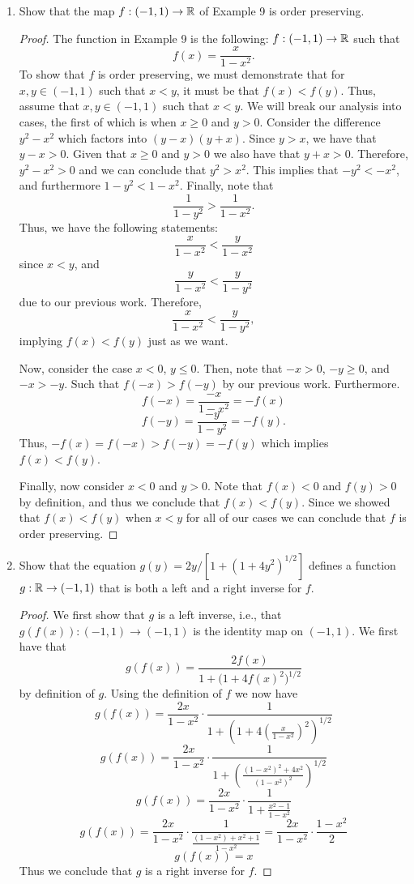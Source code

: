 \documentclass[12pt]{article}
\begin{document}
\begin{enumerate}[label=(\alph*)]
	\item Show that the map $f: (-1, 1) \to \mathbb{R}$ of Example 9 is order preserving.
	
	\begin{proof}
		The function in Example 9 is the following: $f: (-1, 1) \to \mathbb{R}$ such that 
		$$
		f(x) = \frac{x}{1 - x^2}.
		$$
		To show that $f$ is order preserving, we must demonstrate that for $x, y \in (-1, 1)$
		such that $x < y$, it must be that $f(x) < f(y)$. Thus, assume that $x, y \in (-1, 1)$
		such that $x < y$. We will break our analysis into cases, the first of which is 
		when $x \geq 0$ and $y > 0$. Consider the difference $y^2 - x^2$ which factors into
		$(y - x)(y + x)$. Since $y > x$, we have that $y - x > 0$. Given that $x \geq 0$ and $y > 0$
		we also have that $y + x > 0$. Therefore, $y^2 - x^2 > 0$ and we can conclude that 
		$y^2 > x^2$. This implies that $-y^2 < -x^2$, and furthermore $1 - y^2 < 1 - x^2$.
		Finally, note that
		$$
		\frac{1}{1 - y^2} > \frac{1}{1 - x^2}.
		$$
		Thus, we have the following statements:
		$$
		\frac{x}{1 - x^2} < \frac{y}{1 - x^2}
		$$
		since $x < y$, and 
		$$
		\frac{y}{1 - x^2} < \frac{y}{1 - y^2}
		$$
		due to our previous work. Therefore,
		$$
		\frac{x}{1 - x^2} < \frac{y}{1 - y^2},
		$$
		implying $f(x) < f(y)$ just as we want.
		
		Now, consider the case $x < 0$, $y \leq 0$. Then, note that $-x > 0$, $-y \geq 0$, and $-x > -y$.
		Such that $f(-x) > f(-y)$ by our previous work. Furthermore.
		$$
		f(-x) = \frac{-x}{1- x^2} = -f(x)
		$$
		$$
		f(-y) = \frac{-y}{1 - y^2} = -f(y).
		$$
		Thus, $-f(x) = f(-x) > f(-y) = -f(y)$ which implies $f(x) < f(y)$.
		
		Finally, now consider $x < 0$ and $y > 0$. Note that $f(x) < 0$ and $f(y) > 0$ by definition, and
		thus we conclude that $f(x) < f(y)$. Since we showed that $f(x) < f(y)$ when $x < y$ for 
		all of our cases we can conclude that $f$ is order preserving.
	\end{proof}
	 
	\item Show that the equation $g(y) = 2y/[1 + (1 + 4y^2)^{1/2}]$ defines a function
	$g: \mathbb{R} \to (-1, 1)$ that is both a left and a right inverse for $f$.
	\begin{proof}
		We first show that $g$ is a left inverse, i.e., that $g(f(x)): (-1, 1) \to (-1, 1)$ is the identity
		map on $(-1, 1)$.
		We first have that 
		$$
		g(f(x)) = \frac{2f(x)}{1 + \big(1 + 4f(x)^2\big)^{1/2}}
		$$  
		by definition of $g$. Using the definition of $f$ we now have
		$$
		g(f(x)) = \frac{2x}{1 - x^2} \cdot \frac{1}{1 + \left(1 + 4\left(\frac{x}{1 - x^2}\right)^2\right)^{1/2}}
		$$
		$$
		g(f(x)) = \frac{2x}{1 - x^2} \cdot 
		\frac{1}{1 + \left(\frac{(1-x^2)^2 + 4x^2}{(1-x^2)^2}\right)^{1/2}}
		$$
		$$
		g(f(x)) = \frac{2x}{1 - x^2} \cdot \frac{1}{1 + \frac{x^2 - 1}{1 - x^2}}
		$$
		$$
		g(f(x)) = \frac{2x}{1 - x^2} \cdot \frac{1}{\frac{(1 - x^2) + x^2 + 1}{1 - x^2}} = 
		\frac{2x}{1 - x^2} \cdot \frac{1 - x^2}{2}
		$$
		$$
		g(f(x)) = x
		$$
		Thus we conclude that $g$ is a right inverse for $f$.
		

\end{proof}
\end{enumerate}
\end{document}
